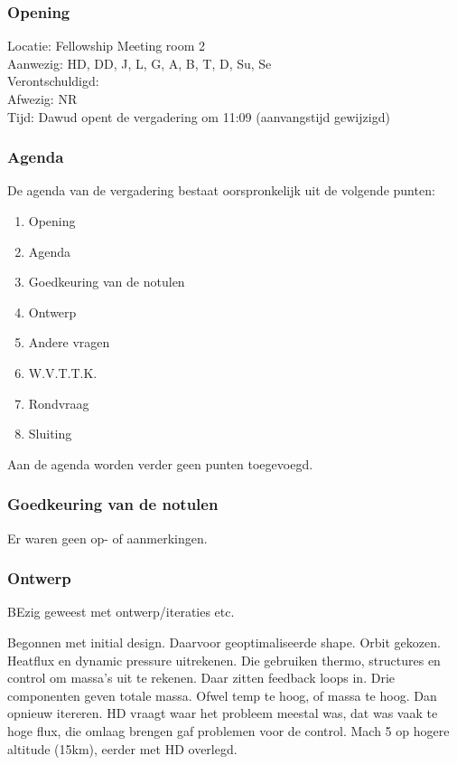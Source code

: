 \subsubsection{Opening}
Locatie: Fellowship Meeting room 2\\
Aanwezig: HD, DD, J, L, G, A, B, T, D, Su, Se\\
Verontschuldigd: \\
Afwezig: NR \\
Tijd: Dawud opent de vergadering om 11:09 (aanvangstijd gewijzigd)\\

\subsubsection{Agenda}
De agenda van de vergadering bestaat oorspronkelijk uit de volgende punten:
\begin{enumerate}
\item Opening
\item Agenda
\item Goedkeuring van de notulen
\item Ontwerp
\item Andere vragen
\item W.V.T.T.K.
\item Rondvraag
\item Sluiting
\end{enumerate}

Aan de agenda worden verder geen punten toegevoegd.

\subsubsection{Goedkeuring van de notulen}
Er waren geen op- of aanmerkingen.

\subsubsection{Ontwerp}
BEzig geweest met ontwerp/iteraties etc. 

Begonnen met initial design. Daarvoor geoptimaliseerde shape. Orbit gekozen. Heatflux en dynamic pressure uitrekenen. Die gebruiken thermo, structures en control om massa's uit te rekenen. Daar zitten feedback loops in. Drie componenten geven totale massa. Ofwel temp te hoog, of massa te hoog. Dan opnieuw itereren. HD vraagt waar het probleem meestal was, dat was vaak te hoge flux, die omlaag brengen gaf problemen voor de control. Mach 5 op hogere altitude (15km), eerder met HD overlegd. 

